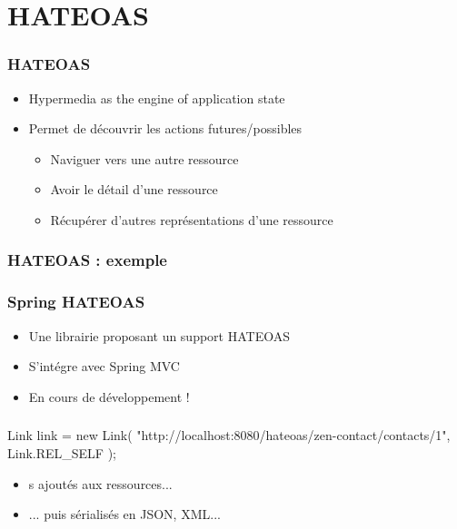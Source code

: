 \section{HATEOAS}


\begin{frame}
 \frametitle{HATEOAS}
 \begin{itemize}
  \item Hypermedia as the engine of application state
  \item Permet de découvrir les actions futures/possibles
  \begin{itemize}
   \item Naviguer vers une autre ressource
   \item Avoir le détail d'une ressource
   \item Récupérer d'autres représentations d'une ressource
  \end{itemize}
 \end{itemize}
\end{frame}

\begin{frame}[fragile]
 \frametitle{HATEOAS : exemple}
 \begin{textcode}
 \end{textcode}

\end{frame}

\begin{frame}
 \frametitle{Spring HATEOAS}
 \begin{itemize}
  \item Une librairie proposant un support HATEOAS
  \item S'intégre avec Spring MVC
  \item En cours de développement !
 \end{itemize}

\end{frame}

\begin{frame}[fragile]
 \frametitle{}

 \begin{javacode}
Link link = new Link(
  "http://localhost:8080/hateoas/zen-contact/contacts/1",
  Link.REL_SELF
);
 \end{javacode}

 \begin{itemize}
  \item {}s ajoutés aux ressources...
  \item ... puis sérialisés en JSON, XML...
 \end{itemize}

\end{frame}

